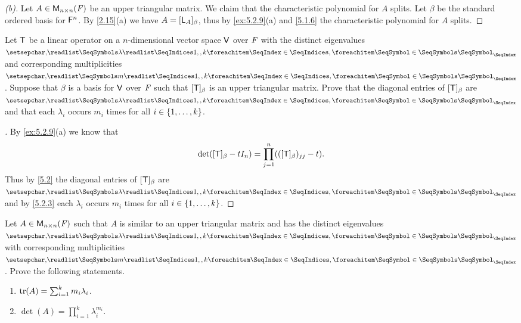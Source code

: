 \begin{proof}[(b)]
  Let \(A \in \mathsf{M}_{{n} \times n}({\mathit{F}})\) be an upper triangular matrix.
  We claim that the characteristic polynomial for \(A\) splits.
  Let \(\beta\) be the standard ordered basis for \(\mathsf{F}^n\).
  By \cref{2.15}(a) we have \(A = [\mathsf{L}_A]_{\beta}\), thus by \cref{ex:5.2.9}(a) and \cref{5.1.6} the characteristic polynomial for \(A\) splits.
\end{proof}

\begin{ex}\label{ex:5.2.10}
  Let \(\mathsf{T}\) be a linear operator on a \(n\)-dimensional vector space \(\mathsf{V}\) over \(\mathit{F}\) with the distinct eigenvalues \(\seq{\lambda}{1,,k}\) and corresponding multiplicities \(\seq{m}{1,,k}\).
  Suppose that \(\beta\) is a basis for \(\mathsf{V}\) over \(\mathit{F}\) such that \([\mathsf{T}]_{\beta}\) is an upper triangular matrix.
  Prove that the diagonal entries of \([\mathsf{T}]_{\beta}\) are \(\seq{\lambda}{1,,k}\) and that each \(\lambda_i\) occurs \(m_i\) times for all \(i \in \left\lbrace1, \dots, k\right\rbrace\).
\end{ex}

\begin{proof}[]
  By \cref{ex:5.2.9}(a) we know that
  \[
    \det([\mathsf{T}]_{\beta} - t I_n) = \prod_{j = 1}^n (([\mathsf{T}]_{\beta})_{j j} - t).
  \]
  Thus by \cref{5.2} the diagonal entries of \([\mathsf{T}]_{\beta}\) are \(\seq{\lambda}{1,,k}\) and by \cref{5.2.3} each \(\lambda_i\) occurs \(m_i\) times for all \(i \in \left\lbrace1, \dots, k\right\rbrace\).
\end{proof}

\begin{ex}\label{ex:5.2.11}
  Let \(A \in \mathsf{M}_{{n} \times n}({\mathit{F}})\) such that \(A\) is similar to an upper triangular matrix and has the distinct eigenvalues \(\seq{\lambda}{1,,k}\) with corresponding multiplicities \(\seq{m}{1,,k}\).
  Prove the following statements.
  \begin{enumerate}
    \item \(\tr(A) = \sum_{i = 1}^k m_i \lambda_i\).
    \item \(\det(A) = \prod_{i = 1}^k \lambda_i^{m_i}\).
  \end{enumerate}
\end{ex}


